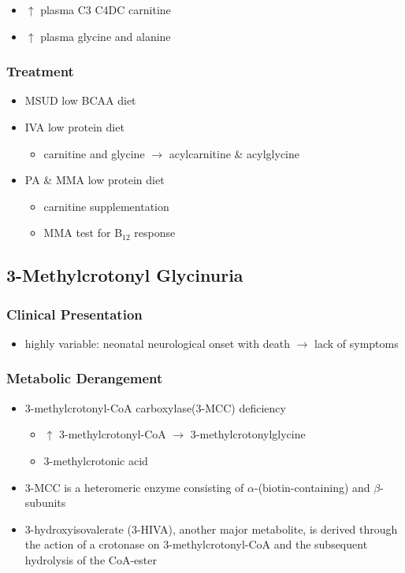 \documentclass{scrartcl}
\begin{document}
\begin{enumerate}
\begin{itemize}
\item \(\uparrow\) plasma C3 \textpm{} C4DC carnitine
\item \(\uparrow\) plasma glycine and alanine
\end{itemize}
\end{enumerate}

\subsubsection{Treatment}
\label{sec:orgf6ab96a}
\begin{itemize}
\item MSUD low BCAA diet
\item IVA low protein diet
\begin{itemize}
\item carnitine and glycine \(\to\) acylcarnitine \& acylglycine
\end{itemize}
\item PA \& MMA low protein diet
\begin{itemize}
\item carnitine supplementation
\item MMA test for B\(_{\text{12}}\) response
\end{itemize}
\end{itemize}

\subsection{3-Methylcrotonyl Glycinuria}
\label{sec:org1494070}
\subsubsection{Clinical Presentation}
\label{sec:org1566b9c}
\begin{itemize}
\item highly variable: neonatal neurological onset with death \(\to\) lack of symptoms
\end{itemize}
\subsubsection{Metabolic Derangement}
\label{sec:orgef36756}
\begin{itemize}
\item 3-methylcrotonyl-CoA carboxylase(3-MCC) deficiency
\begin{itemize}
\item \(\uparrow\) 3-methylcrotonyl-CoA \(\to\) 3-methylcrotonylglycine
\item 3-methylcrotonic acid
\end{itemize}
\item 3-MCC is a heteromeric enzyme consisting of
\(\alpha\)-(biotin-containing) and \(\beta\)-subunits
\item 3-hydroxyisovalerate (3-HIVA), another major metabolite, is derived
through the action of a crotonase on 3-methylcrotonyl-CoA and the
subsequent hydrolysis of the CoA-ester
\end{itemize}
\end{document}
